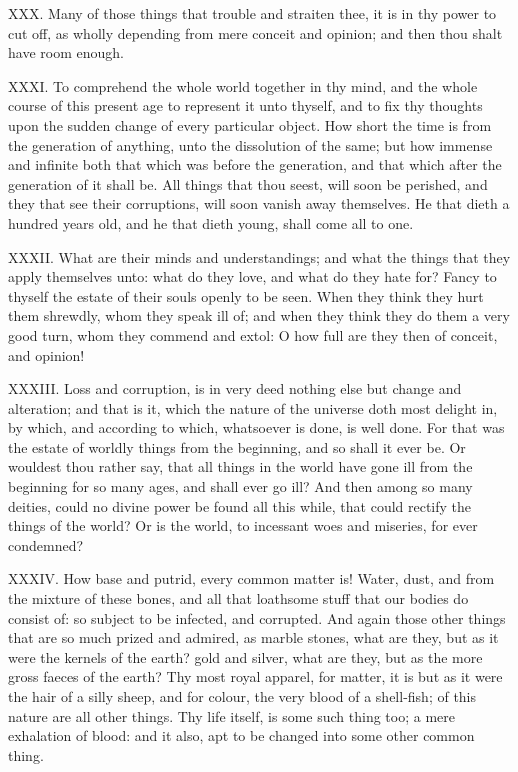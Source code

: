 XXX. Many of those things that trouble and straiten thee, it is in thy
power to cut off, as wholly depending from mere conceit and opinion; and
then thou shalt have room enough.

XXXI. To comprehend the whole world together in thy mind, and the whole
course of this present age to represent it unto thyself, and to fix thy
thoughts upon the sudden change of every particular object. How short the
time is from the generation of anything, unto the dissolution of the same;
but how immense and infinite both that which was before the generation,
and that which after the generation of it shall be. All things that thou
seest, will soon be perished, and they that see their corruptions, will
soon vanish away themselves. He that dieth a hundred years old, and he
that dieth young, shall come all to one.

XXXII. What are their minds and understandings; and what the things that
they apply themselves unto: what do they love, and what do they hate for?
Fancy to thyself the estate of their souls openly to be seen. When they
think they hurt them shrewdly, whom they speak ill of; and when they think
they do them a very good turn, whom they commend and extol: O how full are
they then of conceit, and opinion!

XXXIII. Loss and corruption, is in very deed nothing else but change and
alteration; and that is it, which the nature of the universe doth most
delight in, by which, and according to which, whatsoever is done, is well
done. For that was the estate of worldly things from the beginning, and so
shall it ever be. Or wouldest thou rather say, that all things in the
world have gone ill from the beginning for so many ages, and shall ever go
ill? And then among so many deities, could no divine power be found all
this while, that could rectify the things of the world? Or is the world,
to incessant woes and miseries, for ever condemned?

XXXIV. How base and putrid, every common matter is! Water, dust, and
from the mixture of these bones, and all that loathsome stuff that our
bodies do consist of: so subject to be infected, and corrupted. And again
those other things that are so much prized and admired, as marble stones,
what are they, but as it were the kernels of the earth? gold and silver,
what are they, but as the more gross faeces of the earth? Thy most royal
apparel, for matter, it is but as it were the hair of a silly sheep, and
for colour, the very blood of a shell-fish; of this nature are all other
things. Thy life itself, is some such thing too; a mere exhalation of
blood: and it also, apt to be changed into some other common thing.

